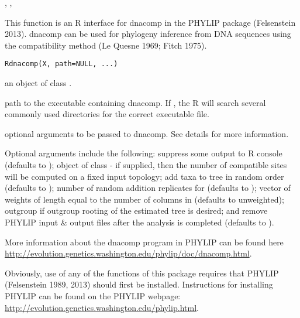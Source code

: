 \documentclass[a4paper]{book}
\begin{document}
%
\begin{SeeAlso}\relax
{}, , 
\end{SeeAlso}
%
\begin{Description}\relax
This function is an R interface for dnacomp in the PHYLIP package (Felsenstein 2013). dnacomp can be used for phylogeny inference from DNA sequences using the compatibility method (Le Quesne 1969; Fitch 1975).
\end{Description}
%
\begin{Usage}
\begin{verbatim}
Rdnacomp(X, path=NULL, ...)
\end{verbatim}
\end{Usage}
%
\begin{Arguments}
\begin{ldescription}
\item[\code{X}] an object of class .
\item[\code{path}] path to the executable containing dnacomp. If , the R will search several commonly used directories for the correct executable file.
\item[\code{...}] optional arguments to be passed to dnacomp. See details for more information.
\end{ldescription}
\end{Arguments}
%
\begin{Details}\relax
Optional arguments include the following:  suppress some output to R console (defaults to );  object of class  - if supplied, then the number of compatible sites will be computed on a fixed input topology;  add taxa to tree in random order (defaults to );  number of random addition replicates for  (defaults to );  vector of weights of length equal to the number of columns in  (defaults to unweighted);  outgroup if outgroup rooting of the estimated tree is desired; and  remove PHYLIP input \& output files after the analysis is completed (defaults to ).

More information about the dnacomp program in PHYLIP can be found here \url{http://evolution.genetics.washington.edu/phylip/doc/dnacomp.html}.

Obviously, use of any of the functions of this package requires that PHYLIP (Felsenstein 1989, 2013) should first be installed. Instructions for installing PHYLIP can be found on the PHYLIP webpage: \url{http://evolution.genetics.washington.edu/phylip.html}.
\end{Details}
\end{document}
